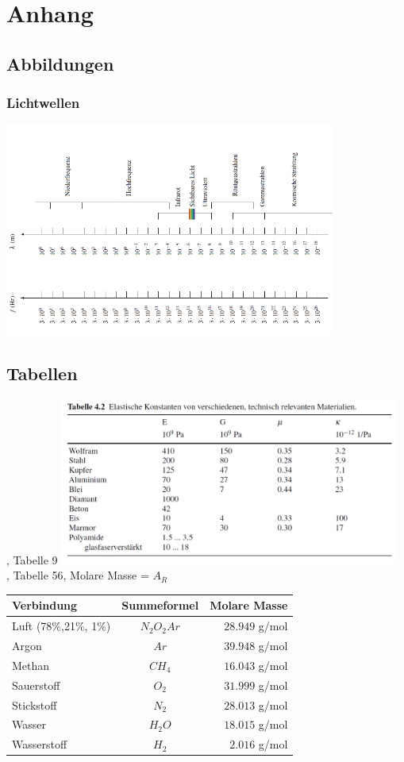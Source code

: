 \section{Anhang}
\subsection{Abbildungen}
\subsubsection{Lichtwellen}
\includegraphics[height=7cm,center,keepaspectratio=true]{Images/lichtwellen.png}

\subsection{Tabellen}

\begin{center}
	, Tabelle 9
	\includegraphics[height=5.5cm,keepaspectratio=true]{Images/elastische_konstanten.png}\\
	
	
	, Tabelle 56, Molare Masse = $A_R$
	\begin{tabular}{ |l|c|r| }
		\hline
		Verbindung & Summeformel & Molare Masse \\
		\hline
		Luft (78\%,21\%, 1\%) & $N_2 O_2 Ar$ & $28.949$ g/mol \\
		Argon 		& $Ar$ 		& $39.948$ g/mol \\
		Methan 		& $CH_4$ 	& $16.043$ g/mol \\
		Sauerstoff 	& $O_2$ 	& $31.999$ g/mol \\
		Stickstoff	& $N_2$ 	& $28.013$ g/mol \\
		Wasser 		& $H_2 O$ 	& $18.015$ g/mol \\
		Wasserstoff & $H_2$ 	&  $2.016$ g/mol \\
		\hline
	\end{tabular}
	
\end{center}

